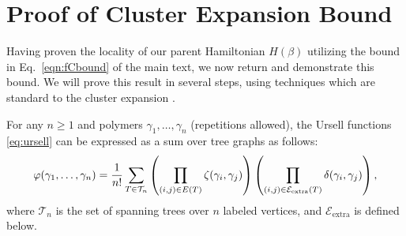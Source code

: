 \section{Proof of Cluster Expansion Bound}
\label{sec:proof_of_eq13}
Having proven the locality of our parent Hamiltonian $H(\beta)$ utilizing the bound in Eq.~\eqref{eqn:fCbound} of the main text, we now return and demonstrate this bound. We will prove this result in several steps, using techniques which are standard to the cluster expansion \cite{Friedli_Velenik_2017,KoteckyPreiss1986,Penrose1967,Kruskal1956,KleinbergTardos2006,FernandezProcacci2007}.

\begin{lemma}
    For any $n \geq 1$ and polymers $\gamma_1,\dots,\gamma_n$ (repetitions allowed), the Ursell functions \eqref{eq:ursell} can be expressed as a sum over tree graphs as follows:
    \begin{equation}
    \label{eq:ursell_tree_graph}
        \varphi(\gamma_1,\dots,\gamma_n) = \frac{1}{n!} \sum_{T \in \mathcal{T}_n} \left( \prod_{(i,j) \in E(T)}\zeta(\gamma_i,\gamma_j)  \right) \left(  \prod_{(i,j) \in \mathcal{E}_{\text{extra}}(T)} \delta(\gamma_i,\gamma_j)  \right) ,
    \end{equation}
    where $\mathcal{T}_n$ is the set of spanning trees over $n$ labeled vertices, and $\mathcal{E}_{\mathrm{extra}}$ is defined below.
\end{lemma}

